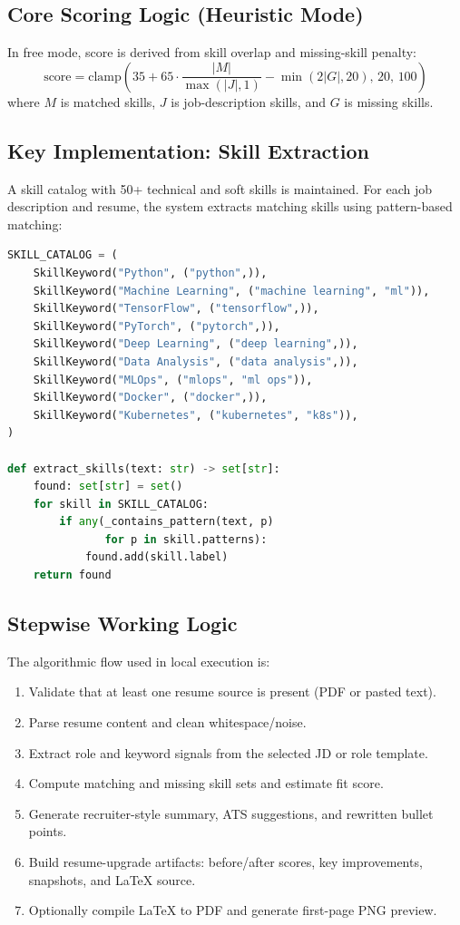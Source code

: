 \documentclass[conference]{IEEEtran}
\begin{document}
\subsection{Core Scoring Logic (Heuristic Mode)}
In free mode, score is derived from skill overlap and missing-skill penalty:
\[
\text{score} = \text{clamp}\left(35 + 65\cdot\frac{|M|}{\max(|J|,1)} - \min(2|G|,20),\,20,\,100\right)
\]
where $M$ is matched skills, $J$ is job-description skills, and $G$ is missing skills.

\subsection{Key Implementation: Skill Extraction}
A skill catalog with 50+ technical and soft skills is maintained. For each job description and resume, the system extracts matching skills using pattern-based matching:

\begin{lstlisting}[language=Python, caption={Skill Extraction Example}]
SKILL_CATALOG = (
    SkillKeyword("Python", ("python",)),
    SkillKeyword("Machine Learning", ("machine learning", "ml")),
    SkillKeyword("TensorFlow", ("tensorflow",)),
    SkillKeyword("PyTorch", ("pytorch",)),
    SkillKeyword("Deep Learning", ("deep learning",)),
    SkillKeyword("Data Analysis", ("data analysis",)),
    SkillKeyword("MLOps", ("mlops", "ml ops")),
    SkillKeyword("Docker", ("docker",)),
    SkillKeyword("Kubernetes", ("kubernetes", "k8s")),
)

def extract_skills(text: str) -> set[str]:
    found: set[str] = set()
    for skill in SKILL_CATALOG:
        if any(_contains_pattern(text, p) 
               for p in skill.patterns):
            found.add(skill.label)
    return found
\end{lstlisting}

\subsection{Stepwise Working Logic}
The algorithmic flow used in local execution is:
\begin{enumerate}
    \item Validate that at least one resume source is present (PDF or pasted text).
    \item Parse resume content and clean whitespace/noise.
    \item Extract role and keyword signals from the selected JD or role template.
    \item Compute matching and missing skill sets and estimate fit score.
    \item Generate recruiter-style summary, ATS suggestions, and rewritten bullet points.
    \item Build resume-upgrade artifacts: before/after scores, key improvements, snapshots, and LaTeX source.
    \item Optionally compile LaTeX to PDF and generate first-page PNG preview.
\end{enumerate}
\end{document}
